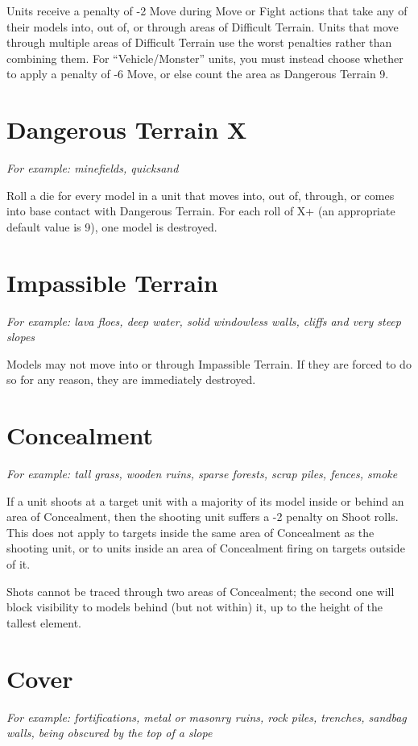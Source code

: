 \begin{multicols}{2}
Units receive a penalty of -2 Move during Move or Fight actions that take any of their models into, out of, or through areas of Difficult Terrain. Units that move through multiple areas of Difficult Terrain use the worst penalties rather than combining them. For ``Vehicle/Monster'' units, you must instead choose whether to apply a penalty of -6 Move, or else count the area as Dangerous Terrain 9.




\section*{Dangerous Terrain X}
\textit{For example: minefields, quicksand}

Roll a die for every model in a unit that moves into, out of, through, or comes into base contact with Dangerous Terrain. For each roll of X+ (an appropriate default value is 9), one model is destroyed.




\section*{Impassible Terrain}
\textit{For example: lava floes, deep water, solid windowless walls, cliffs and very steep slopes}

Models may not move into or through Impassible Terrain. If they are forced to do so for any reason, they are immediately destroyed.




\section*{Concealment}
\textit{For example: tall grass, wooden ruins, sparse forests, scrap piles, fences, smoke}

If a unit shoots at a target unit with a majority of its model inside or behind an area of Concealment, then the shooting unit suffers a -2 penalty on Shoot rolls. This does not apply to targets inside the same area of Concealment as the shooting unit, or to units inside an area of Concealment firing on targets outside of it.

Shots cannot be traced through two areas of Concealment; the second one will block visibility to models behind (but not within) it, up to the height of the tallest element.




\section*{Cover}
\textit{For example: fortifications, metal or masonry ruins, rock piles, trenches, sandbag walls, being obscured by the top of a slope}


\end{multicols}
